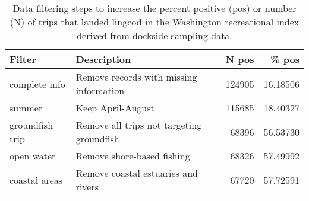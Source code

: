 
\begin{longtable}[t]{llrr}
\caption{\label{tab:reccpuewa-filtersummary}Data filtering steps to increase the percent positive (pos) or number (N) of trips that landed lingcod  in the Washington recreational index derived from dockside-sampling data.}\\
\toprule
Filter & Description & N pos & \% pos\\
\midrule
complete info & Remove records with missing information & 124905 & 16.18506\\
summer & Keep April-August & 115685 & 18.40327\\
groundfish trip & Remove all trips not targeting groundfish & 68396 & 56.53730\\
open water & Remove shore-based fishing & 68326 & 57.49992\\
coastal areas & Remove coastal estuaries and rivers & 67720 & 57.72591\\
\bottomrule
\end{longtable}
